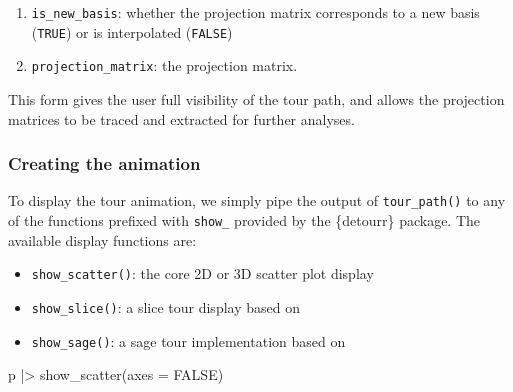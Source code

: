 \begin{enumerate}
\def\labelenumi{\arabic{enumi}.}
\tightlist
\item
  \texttt{is\_new\_basis}: whether the projection matrix corresponds to
  a new basis (\texttt{TRUE}) or is interpolated (\texttt{FALSE})
\item
  \texttt{projection\_matrix}: the projection matrix.
\end{enumerate}

This form gives the user full visibility of the tour path, and allows
the projection matrices to be traced and extracted for further analyses.

\hypertarget{creating-the-animation}{%
\subsubsection{Creating the animation}\label{creating-the-animation}}

To display the tour animation, we simply pipe the output of
\texttt{tour\_path()} to any of the functions prefixed with
\texttt{show\_} provided by the \{detourr\} package. The available
display functions are:

\begin{itemize}
\tightlist
\item
  \texttt{show\_scatter()}: the core 2D or 3D scatter plot display
\item
  \texttt{show\_slice()}: a slice tour display based on
  \citet{laa2020slice}
\item
  \texttt{show\_sage()}: a sage tour implementation based on
  \citet{laa2021burning}
\end{itemize}

\begin{Schunk}
\begin{Sinput}
p |> show_scatter(axes = FALSE)
\end{Sinput}
\end{Schunk}

